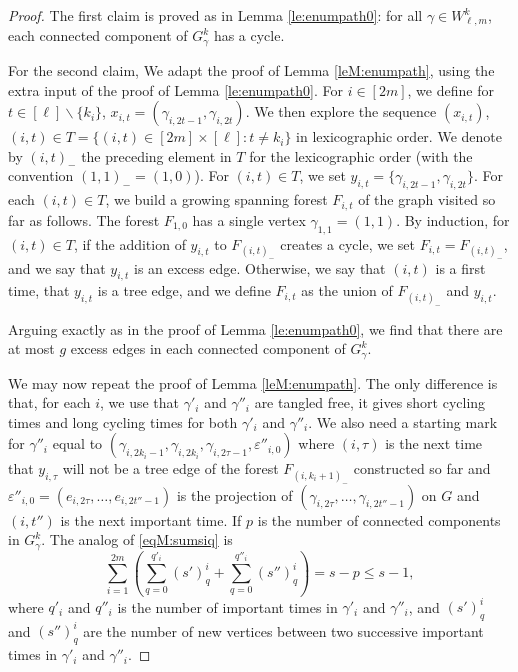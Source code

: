 \documentclass[11pt]{article}
\newcommand{\PAR}[1]{{{\left(#1\right)}}} %
\newcommand{\1}{1\!\!{\sf I}}\newcommand{\IND}{\1}
\newcommand{\veps}{\varepsilon}
\begin{document}
\begin{proof}
The first claim is proved as in Lemma \ref{le:enumpath0}: for all $\gamma \in W_{\ell,m} ^k$, each connected component of $G_\gamma^k$ has a cycle.


For the second claim, We adapt the proof of Lemma \ref{leM:enumpath}, using the extra input of the proof of Lemma \ref{le:enumpath0}. For $i \in [2m]$, we define for $t \in [\ell]\backslash\{k_i\}$, $x_{i,t} = ( \gamma_{i,2t-1}, \gamma_{i,2t} )$. We then explore the sequence $(x_{i,t})$, $(i,t) \in T = \{ (i,t) \in [2m] \times [\ell] : t \ne k_i \}$ in lexicographic order. We denote by $(i,t)_-$ the preceding element in $T$ for the lexicographic order (with the convention $(1,1)_- = (1,0)$). For $(i,t) \in T$, we set $y_{i,t} = \{  \gamma_{i,2t-1}, \gamma_{i,2t} \}$. For each $(i,t) \in T$, we build a growing spanning forest $F_{i,t}$ of the graph visited so far as follows. The forest $F_{1,0}$ has a single vertex $\gamma_{1,1} = (1,1)$. By induction, for $(i,t) \in T$,  if the addition of $y_{i,t}$ to $F_{(i,t)_-}$  creates a cycle, we set $F_{i,t} = F_{(i,t)_-}$, and we say that  $y_{i,t}$ is an excess edge. Otherwise, we say that $(i,t)$ is a first time, that $y_{i,t}$ is a tree edge, and we define $F_{i,t}$ as the union of $F_{(i,t)_-}$ and $y_{i,t}$. 


Arguing exactly as in the proof of Lemma \ref{le:enumpath0},  we find that there are at most  $g$ excess edges in each connected component of $G^k_{\gamma}$.   

   
We may now repeat the proof of Lemma \ref{leM:enumpath}. The only difference is that, for each $i$, we use that $\gamma'_i$ and $\gamma''_i$ are tangled free, it gives short cycling times and long cycling times for both $\gamma'_i$ and $\gamma''_i$.  We also need a starting mark for $\gamma''_i$ equal to $(\gamma_{i,2k_i-1},\gamma_{i,2k_i}, \gamma_{i,2\tau-1}, \veps''_{i,0})$ where  $(i,\tau)$ is the next time that $y_{i,\tau}$ will not be a tree edge of the forest $F_{(i,k_i+1)_-}$ constructed so far and $\veps''_{i,0} = (e_{i,2 \tau }, \ldots , e_{i,2t''-1})$ is the projection of $(\gamma_{i,2 \tau}, \ldots , \gamma_{i,2t''-1})$ on $G$ and $(i,t'')$ is the next important time.  If $p$ is the number of connected components in $G^k_\gamma$. The analog of \eqref{eqM:sumsiq} is
\begin{equation*}\label{eqM:sumsiq0}
\sum_{i = 1}^{2m}\PAR{ \sum_{q=0}^{q'_i} (s')^i_{q} + \sum_{q=0}^{q''_i} (s'')^i_{q} } = s-p \leq s - 1,
\end{equation*}
where  $q'_i$ and $q''_i$ is the number of important times in $\gamma'_i$ and $\gamma''_i$, and $(s')^i_q$ and $(s'')^i _q$ are the number of new vertices between two successive important times in $\gamma'_i$ and $\gamma''_i$. 



\end{proof}
\end{document}

